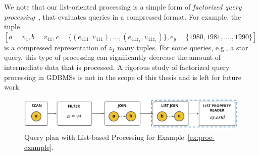 We note that our list-oriented processing is a simple form of {\em factorized query processing}~\cite{fct-databases}, that evaluates queries in a compressed format. For example, the tuple $[a=v_4, b=v_{41}, c=\{(e_{411}, v_{411}), ..., (e_{41z_1}, v_{41z_1})\}, e_y=\{1980, 1981, ...., 1990\}]$ is a compressed representation of $z_1$ many tuples. For some queries, e.g., a star query, this type of processing can significantly decrease the amount of intermediate data that is processed. A rigorous study of factorized query processing in GDBMSs is not in the scope of this thesis and is left for future work.

\begin{figure}
	\hfill\includegraphics[scale=0.78]{img/proc-lbqp}\hfill
	\vspace{-10pt}
	\caption{Query plan with List-based Processing for Example~\ref{ex:proc-example}.}
	\vspace{-8pt}
	\label{fig:proc-lbqp}
\end{figure}


